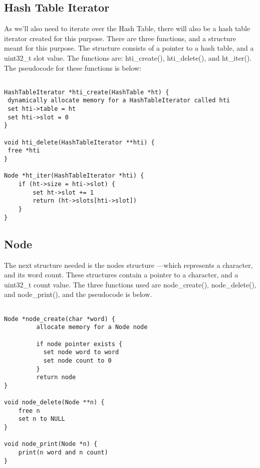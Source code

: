 \documentclass[11pt]{article}
\begin{document}
\subsection{Hash Table Iterator}
As we'll also need to iterate over the Hash Table, there will also be a hash table iterator created for this purpose. There are three functions, and a structure meant for this purpose. The structure consists of a pointer to a hash table, and a uint32\_t slot value. The functions are: hti\_create(), hti\_delete(), and ht\_iter(). The pseudocode for these functions is below:
\begin{verbatim}

HashTableIterator *hti_create(HashTable *ht) {
 dynamically allocate memory for a HashTableIterator called hti
 set hti->table = ht
 set hti->slot = 0
}

void hti_delete(HashTableIterator **hti) {
 free *hti
}

Node *ht_iter(HashTableIterator *hti) {
    if (ht->size = hti->slot) {
        set ht->slot += 1
        return (ht->slots[hti->slot])
    }
}

\end{verbatim}

\subsection{Node} 
The next structure needed is the nodes structure ---which represents a character, and its word count. These structures contain a pointer to a character, and a uint32\_t count value. The three functions used are node\_create(), node\_delete(), and node\_print(), and the pseudocode is below.
\begin{verbatim}

Node *node_create(char *word) {
         allocate memory for a Node node
         
         if node pointer exists {
           set node word to word
           set node count to 0
         }
         return node
}

void node_delete(Node **n) {
    free n
    set n to NULL
}

void node_print(Node *n) {
    print(n word and n count)
}
\end{verbatim} 
\end{document}
